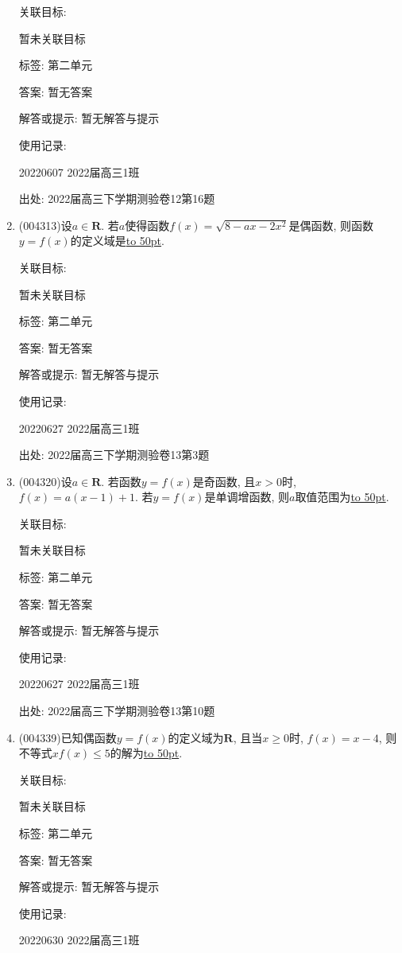 \documentclass[10pt,a4paper]{article}
\newcommand{\blank}[1]{\underline{\hbox to #1pt{}}}
\begin{document}
\begin{enumerate}[1.]
关联目标:

暂未关联目标



标签: 第二单元

答案: 暂无答案

解答或提示: 暂无解答与提示

使用记录:

20220607	2022届高三1班	


出处: 2022届高三下学期测验卷12第16题
\item { (004313)}设$a\in \mathbf{R}$. 若$a$使得函数$f(x)=\sqrt{8-ax-2x^2}$是偶函数, 则函数$y=f(x)$的定义域是\blank{50}.


关联目标:

暂未关联目标



标签: 第二单元

答案: 暂无答案

解答或提示: 暂无解答与提示

使用记录:

20220627	2022届高三1班	


出处: 2022届高三下学期测验卷13第3题
\item { (004320)}设$a\in \mathbf{R}$. 若函数$y=f(x)$是奇函数, 且$x>0$时, $f(x)=a(x-1)+1$. 若$y=f(x)$是单调增函数, 则$a$取值范围为\blank{50}.


关联目标:

暂未关联目标



标签: 第二单元

答案: 暂无答案

解答或提示: 暂无解答与提示

使用记录:

20220627	2022届高三1班	


出处: 2022届高三下学期测验卷13第10题
\item { (004339)}已知偶函数$y=f(x)$的定义域为$\mathbf{R}$, 且当$x\ge 0$时, $f(x)=x-4$, 则不等式$xf(x)\le 5$的解为\blank{50}.


关联目标:

暂未关联目标



标签: 第二单元

答案: 暂无答案

解答或提示: 暂无解答与提示

使用记录:

20220630	2022届高三1班	



\end{enumerate}
\end{document}
